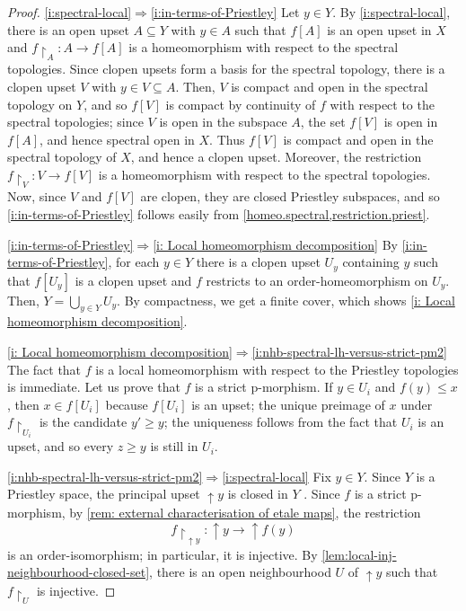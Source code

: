\documentclass[12pt]{amsart}
\theoremstyle{plain}
\theoremstyle{definition}
\renewcommand{\u}{{\uparrow}}
\begin{document}
\begin{proof} 
    \eqref{i:spectral-local}$\Rightarrow$\eqref{i:in-terms-of-Priestley}
    Let $y\in Y$. By \eqref{i:spectral-local}, there is an open upset $A\subseteq Y$ with $y\in A$ such that $f[A]$ is an open upset in $X$ and $ f{\restriction}_A \colon A \to f[A] $ is a homeomorphism with respect to the spectral topologies. Since clopen upsets form a basis for the spectral topology, there is a clopen upset $V$ with $y\in V\subseteq A$. Then, $V$ is compact and open in the spectral topology on $Y$, and so $f[V]$ is compact by continuity of $f$ with respect to the spectral topologies; since $V$ is open in the subspace $A$, the set $f[V]$ is open in $f[A]$, and hence spectral open in $X$. Thus $f[V]$ is compact and open in the spectral topology of $X$, and hence a clopen upset. Moreover, the restriction $ f{\restriction}_V \colon V \to f[V] $ is a homeomorphism with respect to the spectral topologies. Now, since $V$ and $f[V]$ are clopen, they are closed Priestley subspaces, and so \eqref{i:in-terms-of-Priestley} follows easily from  \cref{homeo.spectral,restriction.priest}.

    \eqref{i:in-terms-of-Priestley}$\Rightarrow$\eqref{i: Local homeomorphism decomposition} By \eqref{i:in-terms-of-Priestley}, for each $y\in Y$ there is a clopen upset $U_{y}$ containing $y$ such that $f[U_y]$ is a clopen upset and $f$ restricts to an order-homeomorphism on $U_{y}$. Then, $Y = \bigcup_{y\in Y}U_{y}$. By compactness, we get a finite cover, which shows \eqref{i: Local homeomorphism decomposition}. 

    \eqref{i: Local homeomorphism decomposition}$\Rightarrow$\eqref{i:nhb-spectral-lh-versus-strict-pm2} The fact that $f$ is a local homeomorphism with respect to the Priestley topologies is immediate. Let us prove that $f$ is a strict p-morphism.
    If $y\in U_i$ and $f(y)\le x$, then $x\in f[U_i]$ because $f[U_i]$ is an upset; the unique preimage of $x$ under $f{\restriction}_{U_i}$ is the candidate $y'\ge y$; the uniqueness follows from the fact that $U_i$ is an upset, and so every $z\ge y$ is still in $U_i$.

    \eqref{i:nhb-spectral-lh-versus-strict-pm2}$\Rightarrow$\eqref{i:spectral-local} Fix $y\in Y$. Since $Y$ is a Priestley space, the principal upset ${\u} y$ is closed in $Y$ \cite[Prop.~2.6]{Priestley1984}. Since $f$ is a strict p-morphism, by \cref{rem: external characterisation of etale maps}, the restriction
    \[
    f{\restriction}_{{\u} y}\colon {\u} y \longrightarrow {\u} f(y)
    \]
    is an order-isomorphism; in particular, it is injective. By
    \cref{lem:local-inj-neighbourhood-closed-set}, there is an open neighbourhood $U$ of
    ${\u}y$ such that $f{\restriction}_{U}$ is injective. 
    

\end{proof}
\end{document}
